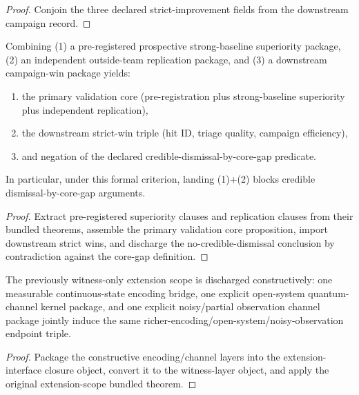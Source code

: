 \begin{proof}
Conjoin the three declared strict-improvement fields from the downstream campaign record.
\end{proof}

\begin{theorem}\label{thm:external-validation-threeway-integration-bundle}
Combining (1) a pre-registered prospective strong-baseline superiority package, (2) an independent outside-team replication package, and (3) a downstream campaign-win package yields:
\begin{enumerate}
\item the primary validation core (pre-registration plus strong-baseline superiority plus independent replication),
\item the downstream strict-win triple (hit ID, triage quality, campaign efficiency),
\item and negation of the declared credible-dismissal-by-core-gap predicate.
\end{enumerate}
In particular, under this formal criterion, landing (1)+(2) blocks credible dismissal-by-core-gap arguments.
\end{theorem}

\begin{proof}
Extract pre-registered superiority clauses and replication clauses from their bundled theorems, assemble the primary validation core proposition, import downstream strict wins, and discharge the no-credible-dismissal conclusion by contradiction against the core-gap definition.
\end{proof}

\begin{theorem}\label{thm:constructive-scope-closure-of-extension-interfaces}
The previously witness-only extension scope is discharged constructively: one measurable continuous-state encoding bridge, one explicit open-system quantum-channel kernel package, and one explicit noisy/partial observation channel package jointly induce the same richer-encoding/open-system/noisy-observation endpoint triple.
\end{theorem}

\begin{proof}
Package the constructive encoding/channel layers into the extension-interface closure object, convert it to the witness-layer object, and apply the original extension-scope bundled theorem.
\end{proof}

